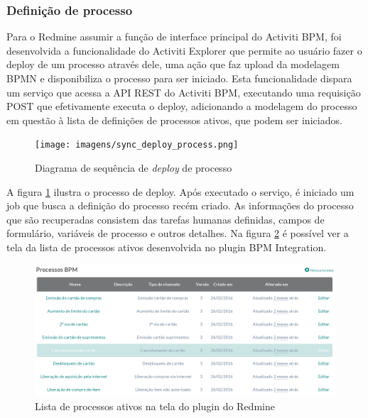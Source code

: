 \subsubsection{Definição de processo}\label{sec:integracao_redmine_activiti_sincronizacao-deploy_processo}

Para o Redmine assumir a função de interface principal do Activiti BPM, foi desenvolvida a funcionalidade do Activiti Explorer que permite ao usuário fazer o deploy de um processo através dele, uma ação que faz upload da modelagem BPMN e disponibiliza o processo para ser iniciado. Esta funcionalidade dispara um serviço que acessa a API REST do Activiti BPM, executando uma requisição POST que efetivamente executa o deploy, adicionando a modelagem do processo em questão à lista de definições de processos ativos, que podem ser iniciados.

\begin{figure}[H]
\centering
\texttt{[image: imagens/sync\_deploy\_process.png]}
\caption{Diagrama de sequência de \textit{deploy} de processo}
\label{fig:sync_deploy_process}
\end{figure}

A figura \ref{fig:sync_deploy_process} ilustra o processo de deploy. Após executado o serviço, é iniciado um job que busca a definição do processo recém criado. As informações do processo que são recuperadas consistem das tarefas humanas definidas, campos de formulário, variáveis de processo e outros detalhes.
Na figura \ref{fig:process_list} é possível ver a tela da lista de processos ativos desenvolvida no plugin BPM Integration.

\begin{figure}[H]
\centering
\includegraphics[width=1\textwidth]{imagens/plugin_process_list.png}
\caption{Lista de processos ativos na tela do plugin do Redmine}
\label{fig:process_list}
\end{figure}

